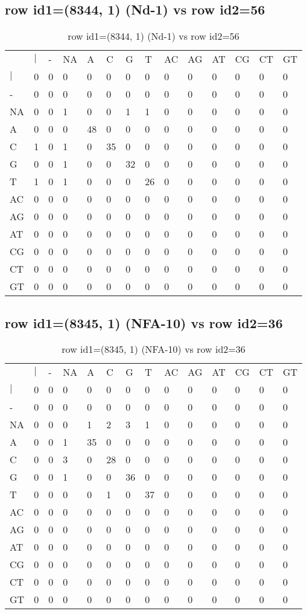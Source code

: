\subsection{row id1=(8344, 1) (Nd-1) vs row id2=56}
\begin{center}
\begin{longtable}{|l|l|l|l|l|l|l|l|l|l|l|l|l|l|}
\caption{row id1=(8344, 1) (Nd-1) vs row id2=56} \label{table_dm550}\\
\hline
\\
\hline
&$|$&-&NA&A&C&G&T&AC&AG&AT&CG&CT&GT\\
$|$&0&0&0&0&0&0&0&0&0&0&0&0&0\\
-&0&0&0&0&0&0&0&0&0&0&0&0&0\\
NA&0&0&1&0&0&1&1&0&0&0&0&0&0\\
A&0&0&0&48&0&0&0&0&0&0&0&0&0\\
C&1&0&1&0&35&0&0&0&0&0&0&0&0\\
G&0&0&1&0&0&32&0&0&0&0&0&0&0\\
T&1&0&1&0&0&0&26&0&0&0&0&0&0\\
AC&0&0&0&0&0&0&0&0&0&0&0&0&0\\
AG&0&0&0&0&0&0&0&0&0&0&0&0&0\\
AT&0&0&0&0&0&0&0&0&0&0&0&0&0\\
CG&0&0&0&0&0&0&0&0&0&0&0&0&0\\
CT&0&0&0&0&0&0&0&0&0&0&0&0&0\\
GT&0&0&0&0&0&0&0&0&0&0&0&0&0\\
\hline
\end{longtable}
\end{center}

\subsection{row id1=(8345, 1) (NFA-10) vs row id2=36}
\begin{center}
\begin{longtable}{|l|l|l|l|l|l|l|l|l|l|l|l|l|l|}
\caption{row id1=(8345, 1) (NFA-10) vs row id2=36} \label{table_dm552}\\
\hline
\\
\hline
&$|$&-&NA&A&C&G&T&AC&AG&AT&CG&CT&GT\\
$|$&0&0&0&0&0&0&0&0&0&0&0&0&0\\
-&0&0&0&0&0&0&0&0&0&0&0&0&0\\
NA&0&0&0&1&2&3&1&0&0&0&0&0&0\\
A&0&0&1&35&0&0&0&0&0&0&0&0&0\\
C&0&0&3&0&28&0&0&0&0&0&0&0&0\\
G&0&0&1&0&0&36&0&0&0&0&0&0&0\\
T&0&0&0&0&1&0&37&0&0&0&0&0&0\\
AC&0&0&0&0&0&0&0&0&0&0&0&0&0\\
AG&0&0&0&0&0&0&0&0&0&0&0&0&0\\
AT&0&0&0&0&0&0&0&0&0&0&0&0&0\\
CG&0&0&0&0&0&0&0&0&0&0&0&0&0\\
CT&0&0&0&0&0&0&0&0&0&0&0&0&0\\
GT&0&0&0&0&0&0&0&0&0&0&0&0&0\\
\hline
\end{longtable}
\end{center}

